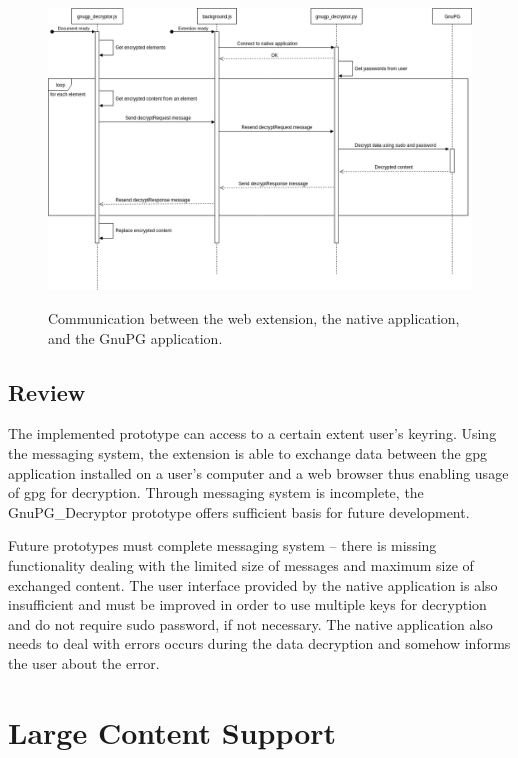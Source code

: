 \begin{figure}[H]
    \begin{center}
        \label{img:gnupg_decryptor-sequence}
        \includegraphics[width=1.3\textwidth,angle=90]{obrazky-figures/sequence-gnupg_decryptor.png}
        \caption{Communication between the web extension, the native application, and the GnuPG application.}
    \end{center}
\end{figure}

\subsection{Review}
The implemented prototype can access to a certain extent user's keyring. Using the messaging system, the extension is able to exchange data between the gpg application installed on a user's computer and a web browser thus enabling usage of gpg for decryption. Through messaging system is incomplete, the GnuPG\_Decryptor prototype offers sufficient basis for future development.

Future prototypes must complete messaging system -- there is missing functionality dealing with the limited size of messages and maximum size of exchanged content. The user interface provided by the native application is also insufficient and must be improved in order to use multiple keys for decryption and do not require sudo password, if not necessary. The native application also needs to deal with errors occurs during the data decryption and somehow informs the user about the error.

\section{Large Content Support}
